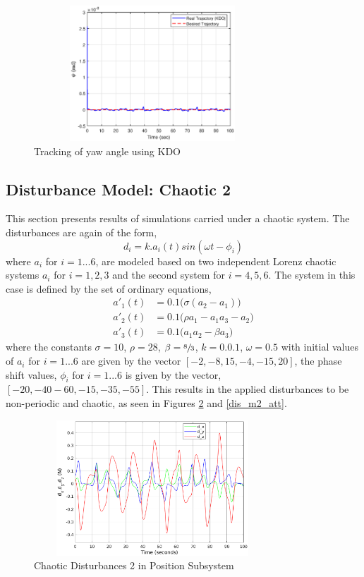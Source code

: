 \documentclass[letterpaper%
, twoside%
, 12pt%
,memoire%
, english%
,creativecommons,hyperref%
]{thETS}
\begin{document}
\begin{figure}[H]
\centering
\includegraphics[width=3.5in,height=2in]{Figures/results/tracking/yaw_trac_dis_m1_kdo.eps}
\caption{Tracking of yaw angle using KDO}
\label{yaw_trac_dis_m1_kdo}
\end{figure}

\subsection{Disturbance Model: Chaotic 2}
This section presents results of simulations carried under a chaotic system. The disturbances are again of the form,
\begin{equation}
d_i = k.a_i(t)sin(\omega t-\phi_i)
\label{eq:dist_2}
\end{equation}
where $a_i$ for $i=1...6$, are modeled based on two independent Lorenz chaotic systems $a_i$ for $i=1,2,3$ and the second system for $i=4,5,6$. The system in this case is defined by the set of ordinary equations, 
\begin{subequations}
\begin{align}
a'_1(t) &= 0.1\big(\sigma(a_2-a_1)\big)\\
a'_2(t) &= 0.1\big(\rho a_1 - a_1 a_3 - a_2\big)\\
a'_3(t) &= 0.1\big(a_1 a_2 - \beta a_3\big)
\end{align}
\end{subequations}
where the constants $\sigma=10$, $\rho=28$, $\beta=\sfrac{8}{3}$, $k=0.0.1$, $\omega=0.5$ with initial values of $a_i$ for $i=1...6$ are given by the vector $[-2,-8,15,-4,-15,20]$, the phase shift values, $\phi_i$ for $i=1...6$ is given by the vector, $[-20,-40-60,-15,-35,-55]$. This results in the applied disturbances to be non-periodic and chaotic, as seen in Figures \ref{dis_m2_pos} and \ref{dis_m2_att}.

\begin{figure}[H]
\centering
\includegraphics[width=3.5in,height=2in]{Figures/results/chaotic_disturbances/dis_m2_pos.eps}
\caption{Chaotic Disturbances 2 in Position Subsystem}
\label{dis_m2_pos}
\end{figure}
\end{document}
